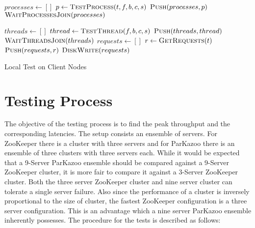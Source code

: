 \begin{algorithm}
	\begin{algorithmic}
		\State $processes\gets[]$
		\State $p\gets\Call{TestProcess}{t,f,b,c,s}$
		\State $\Call{Push}{processes, p}$
		\EndFor
		\State $\Call{WaitProcessesJoin}{processes}$
		\EndProcedure
		
		\State $threads\gets[]$
		\State $thread\gets\Call{TestThread}{f,b,c,s}$
		\State $\Call{Push}{threads, thread}$
		\EndFor
		\State $\Call{WaitThreadsJoin}{threads}$
		\State $requests\gets[]$
		\State $r\gets\Call{GetRequests}{t}$
		\State $\Call{Push}{requests, r}$
		\EndFor
		\State $\Call{DiskWrite}{requests}$
		\EndProcedure
		
	\end{algorithmic}
	\caption{Local Test on Client Nodes}
	
\end{algorithm}

\section{Testing Process}
The objective of the testing process is to find the peak throughput and the corresponding latencies. The setup consists an ensemble of servers. For ZooKeeper there is a cluster with three servers and for ParKazoo there is an ensemble of three clusters with three servers each. While it would be expected that a 9-Server ParKazoo ensemble should be compared against a 9-Server ZooKeeper cluster, it is more fair to compare it against a 3-Server ZooKeeper cluster. Both the three server ZooKeeper cluster and nine server cluster can tolerate a single server failure. Also since the performance of a cluster is inversely proportional to the size of cluster, the fastest ZooKeeper configuration is a three server configuration. This is an advantage which a nine server ParKazoo ensemble inherently possesses. The procedure for the tests is described as follows:

